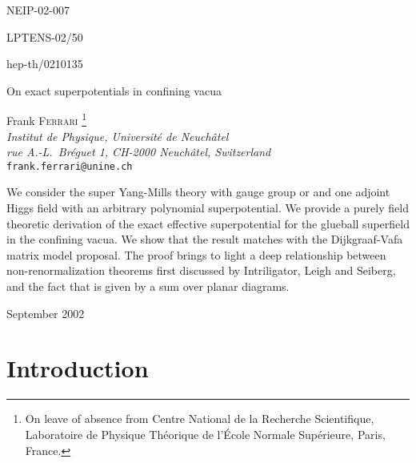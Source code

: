 \documentclass[a4paper,12pt]{article}
\def\suN{{\rm SU}(N)}
\def\uN{{\rm U}(N)}
\begin{document}
%
\def\L{\Lambda}
%
\pagestyle{empty}
%
{\parskip 0in

\hfill NEIP-02-007

\hfill LPTENS-02/50

\hfill hep-th/0210135}

\vfill
%
\begin{center}
{\LARGE On exact superpotentials in confining vacua}



\vspace{0.4in}

Frank F{\scshape errari}{\renewcommand{\thefootnote}{\myHighlight{$\!\!\dagger$}\coordHE{}}
\footnote{On leave of absence from Centre 
National de la Recherche Scientifique, Laboratoire de Physique 
Th\'eorique de l'\'Ecole Normale Sup\'erieure, Paris, France.}}
\\
\medskip
{\it Institut de Physique, Universit\'e de Neuch\^atel\\
rue A.-L.~Br\'eguet 1, CH-2000 Neuch\^atel, Switzerland}\\
\smallskip
{\tt frank.ferrari@unine.ch}
\end{center}

\vfill\noindent
We consider the \coordHE{} super Yang-Mills theory with gauge group
\myHighlight{$\uN$}\coordHE{} or \myHighlight{$\suN$}\coordHE{} and one adjoint Higgs field with an arbitrary
polynomial superpotential.
We provide a purely field theoretic derivation of the
exact effective superpotential \coordHE{} for the glueball superfield
\coordHE{} in the confining vacua.
We show that the result matches with the Dijkgraaf-Vafa matrix model
proposal. The proof brings to light a deep relationship between
non-renormalization theorems first discussed by Intriligator, Leigh
and Seiberg, and the fact that \coordHE{} is given by a sum over planar
diagrams.

\vfill

\medskip
%
\begin{flushleft}
September 2002
\end{flushleft}

\newpage\pagestyle{plain}
\baselineskip 16pt
\setcounter{footnote}{0}

%
\section{Introduction}
%
\end{document}

